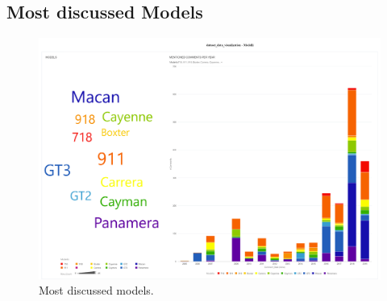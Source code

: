 \subsection{Most discussed Models}

\begin{figure}[H]
	\centering
	\includegraphics[width=\textwidth]{figures/odv_export/dataset_data_visualization_13.pdf}
	\caption{Most discussed models.}
	\label{fig:models}
\end{figure}